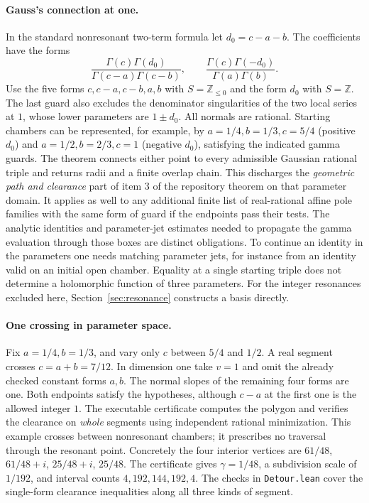 \paragraph{Gauss's connection at one.}
In the standard nonresonant two-term formula let $d_0=c-a-b$. The coefficients have the forms
\[
 \frac{\Gamma(c)\Gamma(d_0)}{\Gamma(c-a)\Gamma(c-b)},\qquad
 \frac{\Gamma(c)\Gamma(-d_0)}{\Gamma(a)\Gamma(b)} .
\]
Use the five forms $c,c-a,c-b,a,b$ with $S=\mathbb Z_{\le0}$ and the form $d_0$ with $S=\mathbb Z$. The last guard also excludes the denominator singularities of the two local series at $1$, whose lower parameters are $1\pm d_0$. All normals are rational. Starting chambers can be represented, for example, by $a=1/4,b=1/3,c=5/4$ (positive $d_0$) and $a=1/2,b=2/3,c=1$ (negative $d_0$), satisfying the indicated gamma guards. The theorem connects either point to every admissible Gaussian rational triple and returns radii and a finite overlap chain. This discharges the \emph{geometric path and clearance} part of item 3 of the repository theorem on that parameter domain. It applies as well to any additional finite list of real-rational affine pole families with the same form of guard if the endpoints pass their tests. The analytic identities and parameter-jet estimates needed to propagate the gamma evaluation through those boxes are distinct obligations. To continue an identity in the parameters one needs matching parameter jets, for instance from an identity valid on an initial open chamber. Equality at a single starting triple does not determine a holomorphic function of three parameters. For the integer resonances excluded here, Section~\ref{sec:resonance} constructs a basis directly.

\paragraph{One crossing in parameter space.}
Fix $a=1/4,b=1/3$, and vary only $c$ between $5/4$ and $1/2$. A real segment crosses $c=a+b=7/12$. In dimension one take $v=1$ and omit the already checked constant forms $a,b$. The normal slopes of the remaining four forms are one. Both endpoints satisfy the hypotheses, although $c-a$ at the first one is the allowed integer $1$. The executable certificate computes the polygon and verifies the clearance on \emph{whole} segments using independent rational minimization. This example crosses between nonresonant chambers; it prescribes no traversal through the resonant point.
Concretely the four interior vertices are $61/48$, $61/48+i$, $25/48+i$, $25/48$. The certificate gives $\gamma=1/48$, a subdivision scale of $1/192$, and interval counts $4,192,144,192,4$. The checks in \texttt{Detour.lean} cover the single-form clearance inequalities along all three kinds of segment.
